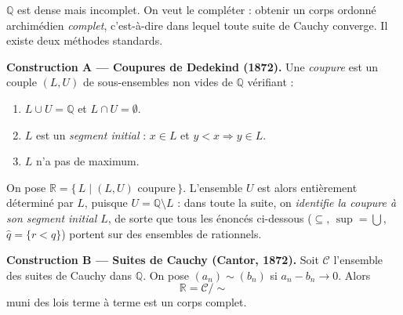 ﻿%



$\mathbb{Q}$ est dense mais incomplet. On veut le compléter : obtenir un corps
ordonné archimédien \emph{complet}, c'est-à-dire dans lequel toute suite de
Cauchy converge. Il existe deux méthodes standards.

\begin{tcolorbox}[thmbox]
  \textbf{Construction A — Coupures de Dedekind (1872).}\enspace%
  Une \emph{coupure} est un couple $(L, U)$ de sous-ensembles non vides de $\mathbb{Q}$
  vérifiant :
  \begin{enumerate}
    \item $L \cup U = \mathbb{Q}$ et $L \cap U = \emptyset$.
    \item $L$ est un \emph{segment initial} : $x \in L$ et $y < x \Rightarrow y \in L$.
    \item $L$ n'a pas de maximum.
  \end{enumerate}
  On pose $\mathbb{R} = \{\,L\mid (L,U)\text{ coupure}\,\}$. L'ensemble $U$ est alors
  entièrement déterminé par $L$, puisque $U = \mathbb{Q}\setminus L$ : dans toute la suite, on
  \emph{identifie la coupure à son segment initial $L$}, de sorte que tous les
  énoncés ci-dessous ($\subseteq$, $\sup = \bigcup$, $\hat q = \{r < q\}$) portent
  sur des ensembles de rationnels.
\end{tcolorbox}

\begin{tcolorbox}[thmbox]
  \textbf{Construction B — Suites de Cauchy (Cantor, 1872).}\enspace%
  Soit $\mathcal{C}$ l'ensemble des suites de Cauchy dans $\mathbb{Q}$.
  On pose $(a_n) \sim (b_n)$ si $a_n - b_n \to 0$. Alors
  \[
    \mathbb{R} = \mathcal{C}/{\sim}
  \]
  muni des lois terme à terme est un corps complet.
\end{tcolorbox}


